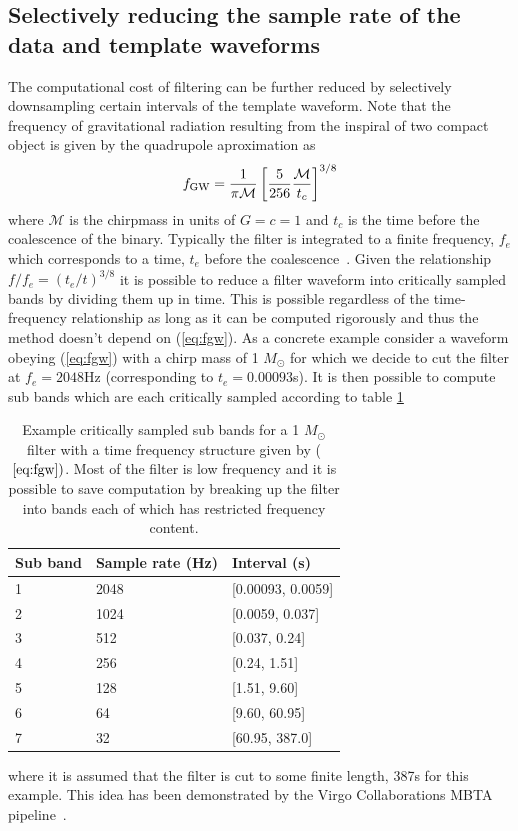 \subsection{Selectively reducing the sample rate of the data and template
waveforms}
The computational cost of filtering can be further reduced by selectively
downsampling certain intervals of the template waveform.  Note that the
frequency of gravitational radiation resulting from the inspiral of two
compact object is given by the quadrupole aproximation as ~\cite{finn1993}
\begin{equation}
\label{eq:fgw}
f_{\rm GW} = \frac{1}{\mathcal{\pi M}} \left[ \frac{5}{256}\frac{\mathcal{M}}{t_c} \right]^{3/8}
\end{equation}
where $\mathcal{M}$ is the chirpmass in units of $G=c=1$ and $t_c$ is the time
before the coalescence of the binary.  Typically the filter is integrated to
a finite frequency, $f_e$ which corresponds to a time, $t_e$ before the 
coalescence~\cite{kidder1992, blanchet2002, findchirppaper, hanna2009}.  Given
the relationship $f/f_e = (t_e/t)^{3/8}$ it is possible to reduce a
filter waveform into critically sampled bands by dividing them up in time.
This is possible regardless of the time-frequency relationship as long as
it can be computed rigorously and thus the method doesn't depend on 
(\ref{eq:fgw}).  As a concrete example consider a waveform obeying 
(\ref{eq:fgw}) with a chirp mass of 1 $M_{\odot}$ for which we decide
to cut the filter at $f_e = 2048$Hz (corresponding to $t_e = 0.00093$s).  
It is then possible to compute sub bands which are each critically sampled
according to table \ref{table1}  
\begin{table}[!h]
\caption{
Example critically sampled sub bands for a 1 $M_{\odot}$ filter with a 
time frequency structure given by ($\ref{eq:fgw})$.  Most of the filter is
low frequency and it is possible to save computation by breaking up the filter
into bands each of which has restricted frequency content. 
}
\begin{center}
\label{table1}
\begin{tabular}{@{} lll @{}}
\hline
\hline
Sub band & Sample rate (Hz) &Interval (s) \\
\hline
1 & 2048 & [0.00093, 0.0059] \\
2 & 1024 & [0.0059, 0.037]  \\
3 & 512  & [0.037, 0.24]   \\
4 & 256  & [0.24, 1.51]   \\
5 & 128  & [1.51, 9.60]   \\
6 & 64   & [9.60, 60.95]  \\
7 & 32   & [60.95, 387.0]  \\
\hline
\end{tabular}
\end{center}
\end{table}
where it is assumed that the filter is cut to some finite length, 387s 
for this example.  This idea has been demonstrated by the Virgo Collaborations
MBTA pipeline~\cite{beauville2006, beauville2008}.

